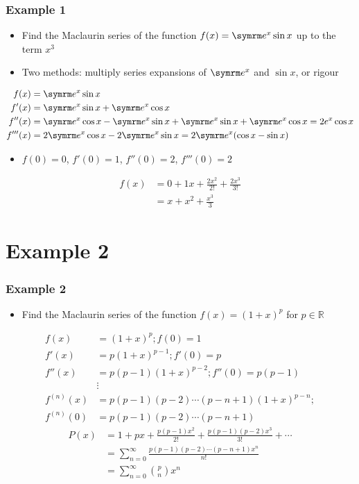 \documentclass{beamer}
\begin{document}
\begin{frame}
  \frametitle{Example 1}
  \begin{itemize}
    \item Find the Maclaurin series of the function \( f(x) = \e^x\sin x \) up to the term \( x^3 \)
    \item Two methods: multiply series expansions of \( \e^x \) and \( \sin x \), or rigour
  \end{itemize}
  \begin{align*}
    f(x) & = \e^x\sin x \\
    f'(x) & = \e^x\sin x + \e^x\cos x \\
    f''(x) & = \e^x\cos x - \e^x\sin x + \e^x\sin x + \e^x\cos x = 2e^x\cos x \\
    f'''(x) & = 2\e^x\cos x - 2\e^x\sin x = 2\e^x(\cos x - \sin x)
  \end{align*}
  \begin{itemize}
    \item \( f(0) = 0 \), \( f'(0) = 1 \), \( f''(0) = 2 \), \( f'''(0) = 2 \)
  \end{itemize}
  \begin{align*}
    f(x) & = 0 + 1x + \frac{2x^2}{2!} + \frac{2x^3}{3!} \\
    & = x + x^2 + \frac{x^3}{3}
  \end{align*}
\end{frame}

\section{Example 2}

\begin{frame}
  \frametitle{Example 2}
  \begin{itemize}
    \item Find the Maclaurin series of the function \( f(x) = (1 + x)^p \) for \( p \in \mathbb{R} \)
  \end{itemize}
  \begin{align*}
    f(x) & = (1 + x)^p; f(0) = 1 \\
    f'(x) & = p(1 + x)^{p - 1}; f'(0) = p \\
    f''(x) & = p(p - 1) (1 + x)^{p - 2}; f''(0) = p(p - 1) \\
    & \vdots \\
    f^{(n)}(x) & = p(p - 1)(p - 2) \cdots (p - n + 1) (1 + x)^{p - n}; \\
    f^{(n)}(0) & = p(p - 1)(p - 2) \cdots (p - n + 1)
  \end{align*}
  \begin{align*}
    P(x) & = 1 + px + \frac{p(p - 1)x^2}{2!} + \frac{p(p - 1)(p - 2)x^3}{3!} + \cdots \\
    & = \sum_{n = 0}^{\infty} \frac{p(p - 1)(p - 2) \cdots (p - n + 1)x^n}{n!} \\
    & = \sum_{n = 0}^{\infty} \binom{p}{n} x^n
  \end{align*}
\end{frame}
\end{document}
